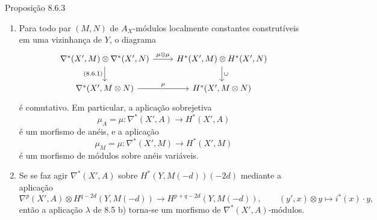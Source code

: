 \begin{statement}{Proposição 8.6.3}
\begin{enumerate}[label=\alph*)]
\item Para todo par $(M,N)$ de $A_X$-módulos localmente constantes construtíveis em uma vizinhança de $Y$, o diagrama
\[
\begin{tikzcd}
\nabla^*(X',M)\otimes\nabla^*(X',N)\arrow[r,"\mu\otimes\mu"]\arrow[d,"{(8.6.1)}"']&
H^*(X',M)\otimes H^*(X',N)\arrow[d,"\cup"]\\
\nabla^*(X',M\otimes N)\arrow[r,"\mu"]&
H^*(X',M\otimes N)
\end{tikzcd}
\]
é comutativo. Em particular, a aplicação sobrejetiva
\[
\mu_A=\mu:\nabla^*(X',A)\to H^*(X',A)
\]
é um morfismo de anéis, e a aplicação
\[
\mu_M=\mu:\nabla^*(X',M)\to H^*(X',M)
\]
é um morfismo de módulos sobre anéis variáveis.
\item Se se faz agir $\nabla^*(X',A)$ sobre $H^*(Y,M(-d))(-2d)$ mediante a aplicação
\[
\nabla^p(X',A)\otimes H^{q-2d}(Y,M(-d))
\to H^{p+q-2d}(Y,M(-d)),
\qquad
(y',x)\otimes y\mapsto i^*(x)\cdot y,
\]
então a aplicação $\lambda$ de 8.5 b) torna-se um morfismo de $\nabla^*(X',A)$-módulos.
\end{enumerate}
\end{statement}
